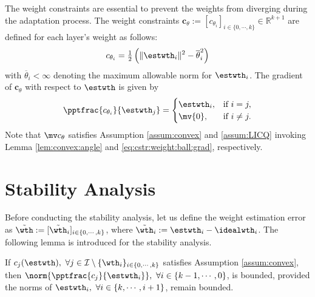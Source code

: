 \documentclass[lettersize,journal]{IEEEtran}
\begin{document}
The weight constraints are essential to prevent the weights from diverging during the adaptation process.
The weight constraints $\boldsymbol{c}_{\theta}:= [c_{\theta_i}]_{i\in\{0,\cdots ,k\}}\in\mathbb R^{k+1}$ are defined for each layer's weight as follows:
\begin{equation}
    c_{\theta_i}
    =
    \tfrac{1}{2}
    \left(
        \Vert \estwth_i\Vert^2 
        -
        \overline\theta_i^2 
    \right)    
    \label{eq:cstr:weight:ball}
\end{equation}
with $\overline\theta_i<\infty$ denoting the maximum allowable norm for $\estwth_i$. 
The gradient of $\boldsymbol{c}_\theta$ with respect to $\estwth$ is given by
\begin{equation}
    \pptfrac{c_{\theta_i}}{\estwth_j} 
    =
    \begin{cases}
        \estwth_i,
        &
        \text{if } i=j,
        \\
        \mv{0},
        &
        \text{if } i\ne j
        .
    \end{cases} 
    \label{eq:cstr:weight:ball:grad}
\end{equation}
Note that $\mv c_{\theta}$ satisfies Assumption \ref{assum:convex} and \ref{assum:LICQ} invoking Lemma \ref{lem:convex:angle} and \eqref{eq:cstr:weight:ball:grad}, respectively.

\section{Stability Analysis}\label{sec:stability}

Before conducting the stability analysis, let us define the weight estimation error as $\tilde\wth:= [\tilde\wth_i]_{i\in\{0,\cdots,k\}}$, where $\tilde\wth_i:=\estwth_i-\idealwth_i$.
The following lemma is introduced for the stability analysis.

\begin{lem} 
    If $c_j(\estwth),\ \forall j\in\mathcal I \setminus \{\wth_i\}_{i\in\{0,\cdots,k\}}$ satisfies Assumption \ref{assum:convex}, then $\norm{\pptfrac{c_j}{\estwth_i}},\ \forall i\in\{k-1,\cdots, 0\}$, is bounded, provided the norms of $\estwth_i,\ \forall i\in\{k,\cdots, i+1\}$, remain bounded.
    \label{lem:cstr:grad:bound}
\end{lem}
\end{document}

